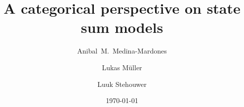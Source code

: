 \documentclass{amsart}
\title{A categorical perspective on state sum models}
\author[Medina-Mardones]{Anibal~M.~Medina-Mardones}
\author[Müller]{Lukas Müller}
\author[Stehouwer]{Luuk Stehouwer}
\date{\today}
\begin{document}
	
	\maketitle
	
	
    
 	
    
    
   	 
	
	\sloppy
	\printbibliography
	\todos
\end{document}
